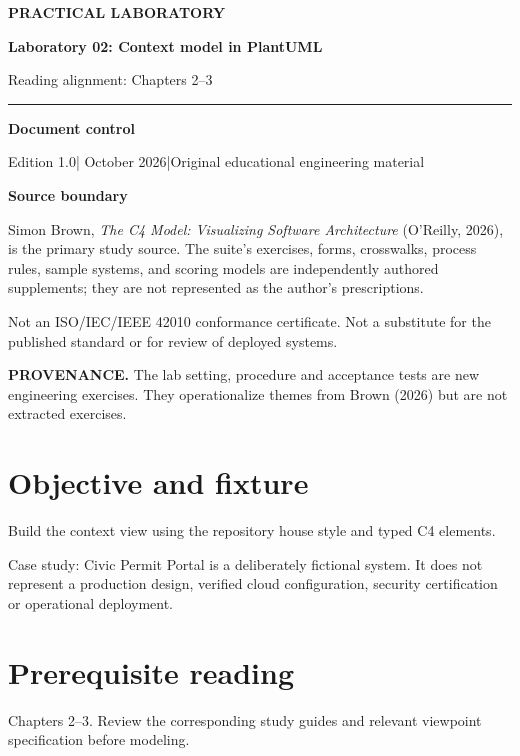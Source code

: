 \documentclass[10pt,letterpaper]{article}
\newcommand{\SourceNote}[1]{\par\smallskip\noindent\colorbox{C4Light}{\parbox{0.94\linewidth}{\footnotesize\textbf{PROVENANCE.} #1}}\par\medskip}
\newcommand{\DocStart}[3]{%
\begin{document}
\begin{titlepage}
\renewcommand{\thepage}{title-\arabic{page}}
\vspace*{0.55in}
{\sffamily\bfseries\small\color{C4Teal}#1}\par\vspace{0.24in}
{\sffamily\bfseries\fontsize{26}{31}\selectfont\color{C4Navy}#2}\par\vspace{0.18in}
{\large\color{C4Gray}#3}\par\vspace{0.4in}
\textcolor{C4Teal}{\rule{\linewidth}{1.15pt}}\par\vspace{0.24in}
\textbf{Document control}\par
Edition 1.0\quad|\quad 30 October 2026\quad|\quad Original educational engineering material\par
\vspace{0.17in}
\textbf{Source boundary}\par
Simon Brown, \emph{The C4 Model: Visualizing Software Architecture} (O'Reilly, 2026), is the primary study source. The suite's exercises, forms, crosswalks, process rules, sample systems, and scoring models are independently authored supplements; they are not represented as the author's prescriptions.\par
\vfill
{\small\color{C4Gray}Not an ISO/IEC/IEEE 42010 conformance certificate. Not a substitute for the published standard or for review of deployed systems.}\par
\end{titlepage}
}
\DocStart{PRACTICAL LABORATORY}{Laboratory 02: Context model in PlantUML}{Reading alignment: Chapters 2–3}
\SourceNote{The lab setting, procedure and acceptance tests are new engineering exercises. They operationalize themes from Brown (2026) but are not extracted exercises.}
\section{Objective and fixture}
Build the context view using the repository house style and typed C4 elements.

Case study: Civic Permit Portal is a deliberately fictional system. It does not represent a production design, verified cloud configuration, security certification or operational deployment.


\section{Prerequisite reading}
Chapters 2–3. Review the corresponding study guides and relevant viewpoint specification before modeling.
\end{document}
